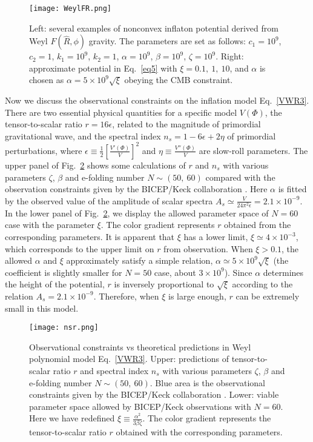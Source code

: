 \documentclass[12pt, a4paper]{article}
\begin{document}
\begin{figure}
	\centering
	\texttt{[image: WeylFR.png]}
	\caption{Left: several examples of nonconvex inflaton potential derived from Weyl $F(\hat R,\phi)$ gravity. The parameters are set as follows: $c_1=10^9$, $c_2=1$, $k_1=10^9$, $k_2=1$, $\alpha=10^9$, $\beta=10^9$, $\zeta=10^9$. Right: approximate potential in Eq.~\ref{eq5} with $\xi=0.1,~1,~10$, and $\alpha$ is chosen as $\alpha=5\times10^9\sqrt{\xi}$ obeying the CMB constraint. }
	\label{WeylFR}
\end{figure}

Now we discuss the observational constraints on the inflation model Eq.~\ref{VWR3}. There are two essential physical quantities for a specific model $V(\Phi)$, the tensor-to-scalar ratio $r=16\epsilon$, related to the magnitude of primordial gravitational wave, and the spectral index $n_s=1-6\epsilon+2\eta$ of primordial perturbations, where $\epsilon\equiv\frac{1}{2}\left[\frac{V'(\Phi)}{V}\right]^2$ and $\eta\equiv\frac{V''(\Phi)}{V}$ are slow-roll parameters. The upper panel of Fig.~\ref{nsr} shows some calculations of $r$ and $n_s$ with various parameters $\zeta$, $\beta$ and e-folding number $N\sim(50,~60)$ compared with the observation constraints given by the BICEP/Keck collaboration \cite{BICEP:2021xfz}. Here $\alpha$ is fitted by the observed value of the amplitude of scalar spectra $A_s\simeq\frac{V}{24\pi^2\epsilon}=2.1\times10^{-9}$. In the lower panel of Fig.~\ref{nsr}, we display the allowed parameter space of $N=60$ case with the parameter $\xi$. The color gradient represents $r$ obtained from the corresponding parameters. It is apparent that $\xi$ has a lower limit, $\xi\simeq4\times10^{-3}$, which corresponds to the upper limit on $r$ from observation. When $\xi>0.1$, the allowed $\alpha$ and $\xi$ approximately satisfy a simple relation, $\alpha\simeq5\times10^9\sqrt\xi$ (the coefficient is slightly smaller for $N=50$ case, about $3\times10^9$). Since $\alpha$ determines the height of the potential, $r$ is inversely proportional to $\sqrt\xi$ according to the relation $A_s=2.1\times10^{-9}$. Therefore, when $\xi$ is large enough, $r$ can be extremely small in this model.

\begin{figure}[h]
	\centering
	\texttt{[image: nsr.png]}
	\caption{Observational constraints vs theoretical predictions in Weyl polynomial model Eq.~\ref{VWR3}. Upper: predictions of tensor-to-scalar ratio $r$ and spectral index $n_s$ with various parameters $\zeta$, $\beta$ and e-folding number $N\sim(50,~60)$. Blue area is the observational constraints given by the BICEP/Keck collaboration \cite{BICEP:2021xfz}. Lower: viable parameter space allowed by BICEP/Keck observations with $N=60$. Here we have redefined $\xi\equiv\frac{\alpha^2}{3\beta\zeta}$. The color gradient represents the tensor-to-scalar ratio $r$ obtained with the corresponding parameters.}
	\label{nsr}
\end{figure}
\end{document}
